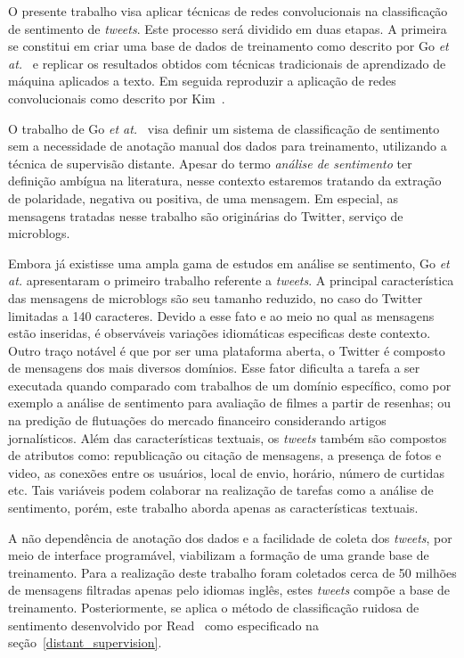 O presente trabalho visa aplicar técnicas de redes convolucionais na classificação de sentimento de \textit{tweets}.
Este processo será dividido em duas etapas.
A primeira se constitui em criar uma base de dados de treinamento como descrito por Go \textit{et at.}~\cite{go09} e
replicar os resultados obtidos com técnicas tradicionais de aprendizado de máquina aplicados a texto.
Em seguida reproduzir a aplicação de redes convolucionais como descrito por Kim~\cite{kim14}.

O trabalho de Go \textit{et at.}~\cite{go09} visa definir um sistema de classificação de sentimento sem a necessidade de
anotação manual dos dados para treinamento, utilizando a técnica de supervisão distante.
Apesar do termo \textit{análise de sentimento} ter definição ambígua na literatura, nesse contexto estaremos tratando da
extração de polaridade, negativa ou positiva, de uma mensagem.
Em especial, as mensagens tratadas nesse trabalho são originárias do Twitter, serviço de microblogs.

Embora já existisse uma ampla gama de estudos em análise se sentimento, Go \textit{et at.} apresentaram o primeiro
trabalho referente a \textit{tweets}.
A principal característica das mensagens de microblogs são seu tamanho reduzido, no caso do Twitter limitadas a
140 caracteres.
Devido a esse fato e ao meio no qual as mensagens estão inseridas, é observáveis variações idiomáticas especificas deste
contexto.
Outro traço notável é que por ser uma plataforma aberta, o Twitter é composto de mensagens dos mais diversos domínios.
Esse fator dificulta a tarefa a ser executada quando comparado com trabalhos de um domínio específico, como por exemplo
a análise de sentimento para avaliação de filmes a partir de resenhas; ou na predição de flutuações do mercado financeiro
considerando artigos jornalísticos.
Além das características textuais, os \textit{tweets} também são compostos de atributos como: republicação ou citação de
mensagens, a presença de fotos e video, as conexões entre os usuários, local de envio, horário, número de curtidas etc.
Tais variáveis podem colaborar na realização de tarefas como a análise de sentimento, porém, este trabalho aborda apenas
as características textuais.

A não dependência de anotação dos dados e a facilidade de coleta dos \textit{tweets}, por meio de interface programável,
viabilizam a formação de uma grande base de treinamento.
Para a realização deste trabalho foram coletados cerca de 50 milhões de mensagens filtradas apenas pelo idiomas inglês,
estes \textit{tweets} compõe a base de treinamento.
Posteriormente, se aplica o método de classificação ruidosa de sentimento desenvolvido por Read~\cite{read05} como
especificado na seção~\ref{distant_supervision}.

